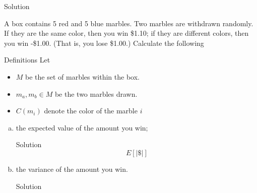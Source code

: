 \documentclass{article}
\begin{document}
\begin{spacing}{1.1}
\begin{homeworkProblem}
\begin{enumerate}[(a)]
\begin{homeworkSection}{Solution}
      \end{homeworkSection}
  \end{enumerate}
\end{homeworkProblem}
\newpage
\begin{homeworkProblem}

  A box contains 5 red and 5 blue marbles. Two marbles are withdrawn 
  randomly. If they are the same color, then you win \$1.10; if they 
  are different colors, then you win -\$1.00. (That is, you lose \$1.00.) 
  Calculate the following

  \begin{homeworkSection}{Definitions}
    Let
      \begin{itemize}
        \item $M$ be the set of marbles within the box.
        \item $m_a, m_b \in M$ be the two marbles drawn.
        \item $C( m_i)$ denote the color of the marble $i$
      \end{itemize}
  \end{homeworkSection}

  \begin{enumerate}[(a)]
    \item the expected value of the amount you win;
      \begin{homeworkSection}{Solution}
        \[E[ |\$|]\]
      \end{homeworkSection}
    \item the variance of the amount you win.
      \begin{homeworkSection}{Solution}

      \end{homeworkSection}
  \end{enumerate}

\end{homeworkProblem}
\end{spacing}
\end{document}
